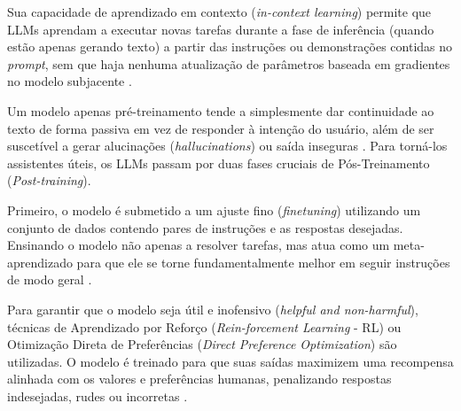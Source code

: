 \documentclass[
    12pt,                %
    openright,           %
    oneside,             %
    a4paper,             %
    english,             %
    brazil               %
]{abntex2}
\begin{document}
Sua capacidade de aprendizado em contexto (\textit{in-context learning}) permite que LLMs aprendam a executar novas tarefas durante a fase de inferência (quando estão apenas gerando texto) a partir das instruções ou demonstrações contidas no \textit{prompt}, sem que haja nenhuma atualização de parâmetros baseada em gradientes no modelo subjacente \cite{jurafsky2026speech}.
\par
Um modelo apenas pré-treinamento tende a simplesmente dar continuidade ao texto de forma passiva em vez de responder à intenção do usuário, além de ser suscetível a gerar alucinações (\textit{hallucinations}) ou saída inseguras \cite{jurafsky2026speech}.
Para torná-los assistentes úteis, os LLMs passam por duas fases cruciais de Pós-Treinamento (\textit{Post-training}).
\par
Primeiro, o modelo é submetido a um ajuste fino (\textit{finetuning}) utilizando um conjunto de dados contendo pares de instruções e as respostas desejadas.
Ensinando o modelo não apenas a resolver tarefas, mas atua como um meta-aprendizado para que ele se torne fundamentalmente melhor em seguir instruções de modo geral \cite{jurafsky2026speech}.
\par
Para garantir que o modelo seja útil e inofensivo (\textit{helpful and non-harmful}), técnicas de Aprendizado por Reforço (\textit{Rein-forcement Learning} - RL) ou Otimização Direta de Preferências (\textit{Direct Preference Optimization}) são utilizadas.
O modelo é treinado para que suas saídas maximizem uma recompensa alinhada com os valores e preferências humanas, penalizando respostas indesejadas, rudes ou incorretas \cite{jurafsky2026speech}.
\end{document}
